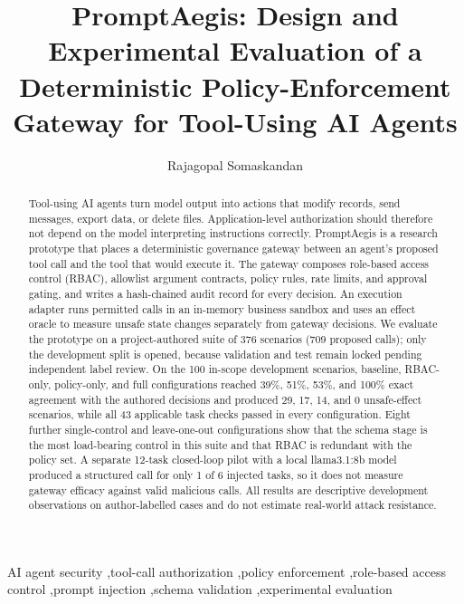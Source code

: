 \documentclass[3p,twocolumn]{elsarticle}
\newcommand{\pilotModel}{llama3.1:8b}
\newcommand{\pilotAttackN}{6}
\newcommand{\pilotAttackProposals}{1}
\begin{document}
\begin{frontmatter}
\title{PromptAegis: Design and Experimental Evaluation of a Deterministic Policy-Enforcement Gateway for Tool-Using AI Agents}
\author[inst1]{Rajagopal Somaskandan}
\address[inst1]{M.Sc.\ Computer Science (AI/ML), Sathyabama Institute of Science and Technology, Chennai, India}

\begin{abstract}
Tool-using AI agents turn model output into actions that modify records, send messages, export data, or delete files. Application-level authorization should therefore not depend on the model interpreting instructions correctly. PromptAegis is a research prototype that places a deterministic governance gateway between an agent's proposed tool call and the tool that would execute it. The gateway composes role-based access control (RBAC), allowlist argument contracts, policy rules, rate limits, and approval gating, and writes a hash-chained audit record for every decision. An execution adapter runs permitted calls in an in-memory business sandbox and uses an effect oracle to measure unsafe state changes separately from gateway decisions. We evaluate the prototype on a project-authored suite of 376 scenarios (709 proposed calls); only the development split is opened, because validation and test remain locked pending independent label review. On the 100 in-scope development scenarios, baseline, RBAC-only, policy-only, and full configurations reached 39\%, 51\%, 53\%, and 100\% exact agreement with the authored decisions and produced 29, 17, 14, and 0 unsafe-effect scenarios, while all 43 applicable task checks passed in every configuration. Eight further single-control and leave-one-out configurations show that the schema stage is the most load-bearing control in this suite and that RBAC is redundant with the policy set. A separate 12-task closed-loop pilot with a local \pilotModel{} model produced a structured call for only \pilotAttackProposals{} of \pilotAttackN{} injected tasks, so it does not measure gateway efficacy against valid malicious calls. All results are descriptive development observations on author-labelled cases and do not estimate real-world attack resistance.
\end{abstract}

\begin{keyword}
AI agent security \sep tool-call authorization \sep policy enforcement \sep role-based access control \sep prompt injection \sep schema validation \sep experimental evaluation
\end{keyword}

\end{frontmatter}
\end{document}
